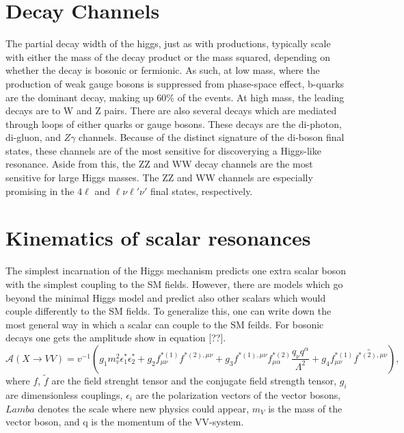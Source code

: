 \section{Decay Channels}
\label{sec:HiggsDecays}

The partial decay width of the higgs, just as with productions, typically 
scale with either the mass of the decay product or the mass squared, 
depending on whether the decay is bosonic or fermionic.  As such, at low 
mass, where the production of weak gauge bosons is suppressed from 
phase-space effect, b-quarks are the dominant decay, making up $60\%$ of 
the events.  At high mass, the leading decays are to W and Z pairs.  There 
are also several decays which are mediated through loops of either quarks 
or gauge bosons.  These decays are the di-photon, di-gluon, and $Z\gamma$
channels.  Because of the distinct signature of the di-boson final states,
these channels are of the most sensitive for discoverying a Higgs-like 
resonance.  
Aside from this, the ZZ and WW decay channels are the most sensitive for 
large Higgs masses.  The ZZ and WW channels are especially promising in 
the $4\ell$ and $\ell\nu\ell'\nu'$ final states, respectively.

\section{Kinematics of scalar resonances}
\label{sec:Kinematics of scalar resonances}

The simplest incarnation of the Higgs mechanism predicts one extra scalar 
boson with the simplest coupling to the SM fields.  However, there are 
models which go beyond the minimal Higgs model and predict also other scalars
which would couple differently to the SM fields.  To generalize this, one 
can write down the most general way in which a scalar can couple to the SM
feilds.  For bosonic decays one gets the amplitude show in equation [??].  
\begin{equation}
  \mathscr{A}(X\to VV) = v^{-1}(g_1m_v^2\epsilon_1^*\epsilon_2^*+g_2f_{\mu\nu}^{*(1)}f^{*(2),\mu\nu}+g_3f^{*(1),\mu\nu}f_{\mu\alpha}^{*(2)}\frac{q_\nu q^\alpha}{\Lambda^2}+g_4f_{\mu\nu}^{*(1)}\tilde{f^{*(2),\mu\nu}}),
\end{equation}
where $f$, $\tilde{f}$ are the field strenght tensor and the conjugate field
strength tensor, $g_i$ are dimensionless couplings, $\epsilon_i$ are the 
polarization vectors of the vector bosons, $Lamba$ denotes the scale where new
physics could appear, $m_V$ is the mass of the vector boson, and q is the
momentum of the VV-system.  

